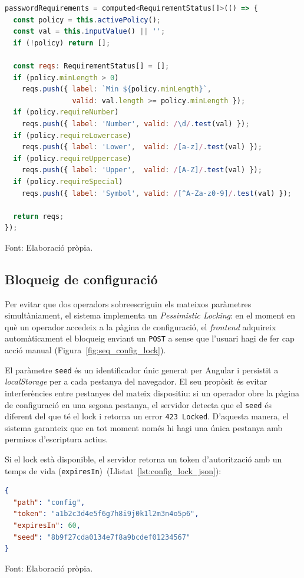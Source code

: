 \begin{lstlisting}[basicstyle=\footnotesize, language=JavaScript, label={lst:password_requirements_signal}, caption={Signal \texttt{passwordRequirements}: avaluaci\'o reactiva dels criteris de la pol\'itica de contrasenya.}]
passwordRequirements = computed<RequirementStatus[]>(() => {
  const policy = this.activePolicy();
  const val = this.inputValue() || '';
  if (!policy) return [];

  const reqs: RequirementStatus[] = [];
  if (policy.minLength > 0)
    reqs.push({ label: `Min ${policy.minLength}`,
                valid: val.length >= policy.minLength });
  if (policy.requireNumber)
    reqs.push({ label: 'Number', valid: /\d/.test(val) });
  if (policy.requireLowercase)
    reqs.push({ label: 'Lower',  valid: /[a-z]/.test(val) });
  if (policy.requireUppercase)
    reqs.push({ label: 'Upper',  valid: /[A-Z]/.test(val) });
  if (policy.requireSpecial)
    reqs.push({ label: 'Symbol', valid: /[^A-Za-z0-9]/.test(val) });

  return reqs;
});
\end{lstlisting}
\smallskip\par{\small\noindent Font: Elaboració pròpia.}

\subsection{Bloqueig de configuració}
Per evitar que dos operadors sobreescriguin els mateixos paràmetres simultàniament, el sistema implementa un \textit{Pessimistic Locking}: en el moment en què un operador accedeix a la pàgina de configuració, el \textit{frontend} adquireix automàticament el bloqueig enviant un \texttt{POST} a  sense que l'usuari hagi de fer cap acció manual (Figura~\ref{fig:seq_config_lock}).

El paràmetre \texttt{seed} és un identificador únic generat per Angular i persistit a \textit{localStorage} per a cada pestanya del navegador. El seu propòsit és evitar interferències entre pestanyes del mateix dispositiu: si un operador obre la pàgina de configuració en una segona pestanya, el servidor detecta que el \texttt{seed} és diferent del que té el lock i retorna un error \texttt{423 Locked}. D'aquesta manera, el sistema garanteix que en tot moment només hi hagi una única pestanya amb permisos d'escriptura actius.

Si el lock està disponible, el servidor retorna un token d'autorització amb un temps de vida (\texttt{expiresIn})~(Llistat~\ref{lst:config_lock_json}):
\begin{lstlisting}[basicstyle=\footnotesize, language=json, label={lst:config_lock_json}, caption={Estructura JSON del bloqueig de configuració.}]
{
  "path": "config",
  "token": "a1b2c3d4e5f6g7h8i9j0k1l2m3n4o5p6",
  "expiresIn": 60,
  "seed": "8b9f27cda0134e7f8a9bcdef01234567"
}
\end{lstlisting}
\smallskip\par{\small\noindent Font: Elaboració pròpia.}

